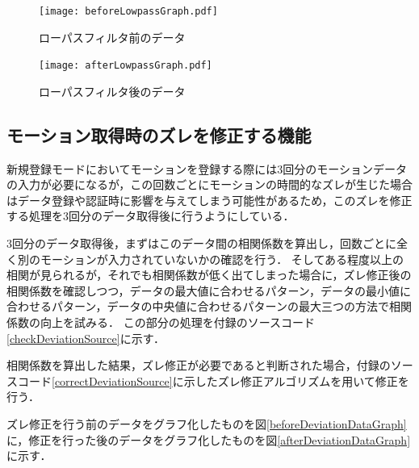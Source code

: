 \documentclass[11pt]{jreport}
\begin{document}
        \begin{figure}[!bhtp]
            \begin{minipage}{0.5\hsize}
                \begin{center}
                    \texttt{[image: beforeLowpassGraph.pdf]}
                \end{center}
                \caption{ローパスフィルタ前のデータ}
                \label{beforeLowpassDataGraph}
            \end{minipage}
            \begin{minipage}{0.5\hsize}
                \begin{center}
                    \texttt{[image: afterLowpassGraph.pdf]}
                \end{center}
                \caption{ローパスフィルタ後のデータ}
                \label{afterLowpassDataGraph}
            \end{minipage}
        \end{figure}

        \subsection{モーション取得時のズレを修正する機能}
        新規登録モードにおいてモーションを登録する際には3回分のモーションデータの入力が必要になるが，この回数ごとにモーションの時間的なズレが生じた場合はデータ登録や認証時に影響を与えてしまう可能性があるため，このズレを修正する処理を3回分のデータ取得後に行うようにしている．

        3回分のデータ取得後，まずはこのデータ間の相関係数を算出し，回数ごとに全く別のモーションが入力されていないかの確認を行う．
        そしてある程度以上の相関が見られるが，それでも相関係数が低く出てしまった場合に，ズレ修正後の相関係数を確認しつつ，データの最大値に合わせるパターン，データの最小値に合わせるパターン，データの中央値に合わせるパターンの最大三つの方法で相関係数の向上を試みる．
        この部分の処理を付録のソースコード\ref{checkDeviationSource}に示す．

        相関係数を算出した結果，ズレ修正が必要であると判断された場合，付録のソースコード\ref{correctDeviationSource}に示したズレ修正アルゴリズムを用いて修正を行う．

        ズレ修正を行う前のデータをグラフ化したものを図\ref{beforeDeviationDataGraph}に，修正を行った後のデータをグラフ化したものを図\ref{afterDeviationDataGraph}に示す．
\end{document}
